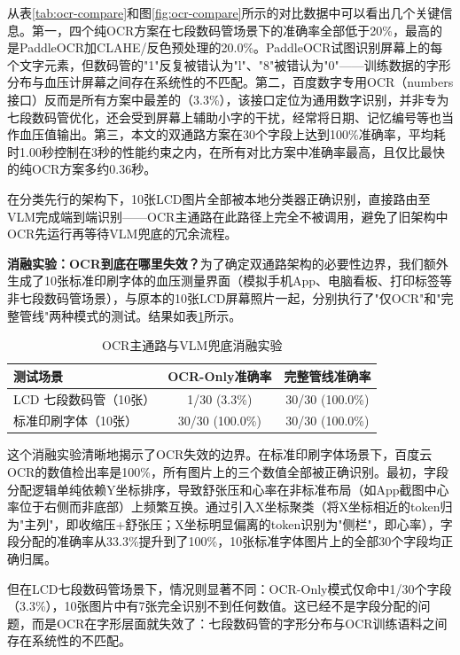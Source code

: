 \documentclass[zihao=-4,a4paper]{ctexart}
\numberwithin{figure}{section}
\numberwithin{table}{section}
\begin{document}
从表\ref{tab:ocr-compare}和图\ref{fig:ocr-compare}所示的对比数据中可以看出几个关键信息。第一，四个纯OCR方案在七段数码管场景下的准确率全部低于20\%，最高的是PaddleOCR加CLAHE/反色预处理的20.0\%。PaddleOCR试图识别屏幕上的每个文字元素，但数码管的"1"反复被错认为"l"、"8"被错认为"0"——训练数据的字形分布与血压计屏幕之间存在系统性的不匹配。第二，百度数字专用OCR（numbers接口）反而是所有方案中最差的（3.3\%），该接口定位为通用数字识别，并非专为七段数码管优化，还会受到屏幕上辅助小字的干扰，经常将日期、记忆编号等也当作血压值输出。第三，本文的双通路方案在30个字段上达到100\%准确率，平均耗时1.00秒控制在3秒的性能约束之内，在所有对比方案中准确率最高，且仅比最快的纯OCR方案多约0.36秒。

在分类先行的架构下，10张LCD图片全部被本地分类器正确识别，直接路由至VLM完成端到端识别——OCR主通路在此路径上完全不被调用，避免了旧架构中OCR先运行再等待VLM兜底的冗余流程。

\textbf{消融实验：OCR到底在哪里失效？}为了确定双通路架构的必要性边界，我们额外生成了10张标准印刷字体的血压测量界面（模拟手机App、电脑看板、打印标签等非七段数码管场景），与原本的10张LCD屏幕照片一起，分别执行了"仅OCR"和"完整管线"两种模式的测试。结果如表\ref{tab:ocr-ablation}所示。

\begin{table}[H]
\centering
\caption{OCR主通路与VLM兜底消融实验}
\label{tab:ocr-ablation}
\begin{tabular}{lcc}
\toprule
\textbf{测试场景} & \textbf{OCR-Only准确率} & \textbf{完整管线准确率} \\
\midrule
LCD 七段数码管（10张） & 1/30 (3.3\%) & 30/30 (100.0\%) \\
标准印刷字体（10张） & 30/30 (100.0\%) & 30/30 (100.0\%) \\
\bottomrule
\end{tabular}
\end{table}

这个消融实验清晰地揭示了OCR失效的边界。在标准印刷字体场景下，百度云OCR的数值检出率是100\%，所有图片上的三个数值全部被正确识别。最初，字段分配逻辑单纯依赖Y坐标排序，导致舒张压和心率在非标准布局（如App截图中心率位于右侧而非底部）上频繁互换。通过引入X坐标聚类（将X坐标相近的token归为"主列"，即收缩压+舒张压；X坐标明显偏离的token识别为"侧栏"，即心率），字段分配的准确率从33.3\%提升到了100\%，10张标准字体图片上的全部30个字段均正确归属。

但在LCD七段数码管场景下，情况则显著不同：OCR-Only模式仅命中1/30个字段（3.3\%），10张图片中有7张完全识别不到任何数值。这已经不是字段分配的问题，而是OCR在字形层面就失效了：七段数码管的字形分布与OCR训练语料之间存在系统性的不匹配。
\end{document}
